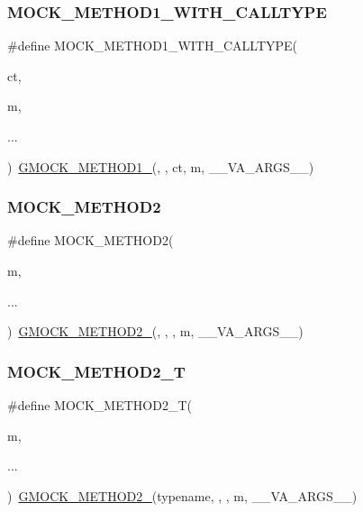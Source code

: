\subsubsection{\texorpdfstring{MOCK\_METHOD1\_WITH\_CALLTYPE}{MOCK\_METHOD1\_WITH\_CALLTYPE}}
{\footnotesize\ttfamily \#define M\+O\+C\+K\+\_\+\+M\+E\+T\+H\+O\+D1\+\_\+\+W\+I\+T\+H\+\_\+\+C\+A\+L\+L\+T\+Y\+PE(\begin{DoxyParamCaption}\item[{}]{ct,  }\item[{}]{m,  }\item[{}]{... }\end{DoxyParamCaption})~\mbox{\hyperlink{gmock-generated-function-mockers_8h_a1bc0012d62440dda77208dabdf4925c9}{G\+M\+O\+C\+K\+\_\+\+M\+E\+T\+H\+O\+D1\+\_\+}}(, , ct, m, \+\_\+\+\_\+\+V\+A\+\_\+\+A\+R\+G\+S\+\_\+\+\_\+)}

\mbox{\label{gmock-generated-function-mockers_8h_ab3fb7d97f21dc99205db38a14df4a1c4}} 
\subsubsection{\texorpdfstring{MOCK\_METHOD2}{MOCK\_METHOD2}}
{\footnotesize\ttfamily \#define M\+O\+C\+K\+\_\+\+M\+E\+T\+H\+O\+D2(\begin{DoxyParamCaption}\item[{}]{m,  }\item[{}]{... }\end{DoxyParamCaption})~\mbox{\hyperlink{gmock-generated-function-mockers_8h_a885295ca6bebb15efb3fc786218c5d47}{G\+M\+O\+C\+K\+\_\+\+M\+E\+T\+H\+O\+D2\+\_\+}}(, , , m, \+\_\+\+\_\+\+V\+A\+\_\+\+A\+R\+G\+S\+\_\+\+\_\+)}

\mbox{\label{gmock-generated-function-mockers_8h_adb6e8d8bd6ab614c62d8ecc2ec163e3c}} 
\subsubsection{\texorpdfstring{MOCK\_METHOD2\_T}{MOCK\_METHOD2\_T}}
{\footnotesize\ttfamily \#define M\+O\+C\+K\+\_\+\+M\+E\+T\+H\+O\+D2\+\_\+T(\begin{DoxyParamCaption}\item[{}]{m,  }\item[{}]{... }\end{DoxyParamCaption})~\mbox{\hyperlink{gmock-generated-function-mockers_8h_a885295ca6bebb15efb3fc786218c5d47}{G\+M\+O\+C\+K\+\_\+\+M\+E\+T\+H\+O\+D2\+\_\+}}(typename, , , m, \+\_\+\+\_\+\+V\+A\+\_\+\+A\+R\+G\+S\+\_\+\+\_\+)}


